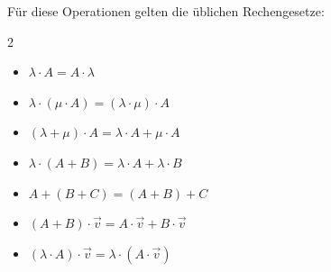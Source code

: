 Für diese Operationen gelten die üblichen Rechengesetze:
\begin{multicols}{2}
    \begin{itemize}
        \item \( \lambda \cdot A = A \cdot \lambda \)
        \item \( \lambda \cdot (\mu \cdot A) = (\lambda \cdot \mu) \cdot A \)
        \item \( (\lambda + \mu) \cdot A = \lambda \cdot A + \mu \cdot A \)
        \item \( \lambda \cdot (A + B) = \lambda \cdot A + \lambda \cdot B \)
        \item \( A + (B + C) = (A + B) + C \)
        \item \( (A + B) \cdot \vec{v} = A \cdot \vec{v} + B \cdot \vec{v} \)
        \item \( (\lambda \cdot A) \cdot \vec{v} = \lambda \cdot (A \cdot \vec{v}) \)
    \end{itemize}
    \end{multicols}
    
